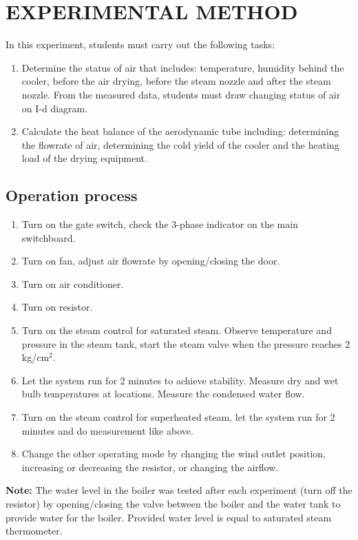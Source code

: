 \section{EXPERIMENTAL METHOD}
In this experiment, students must carry out the following tasks:
\begin{enumerate}
    \item Determine the status of air that includes: temperature, humidity behind the cooler, before the air drying, before the steam nozzle and after the steam nozzle. From the measured data, students must draw changing status of air on I-d diagram.
    \item Calculate the heat balance of the aerodynamic tube including: determining the flowrate of air, determining the cold yield of the cooler and the heating load of the drying equipment.
\end{enumerate}

\subsection{Operation process}
\begin{enumerate}
    \item Turn on the gate switch, check the 3-phase indicator on the main switchboard.
    \item Turn on fan, adjust air flowrate by opening/closing the door.
    \item Turn on air conditioner.
    \item Turn on resistor.
    \item Turn on the steam control for saturated steam. Observe temperature and pressure in the steam tank, start the steam valve when the pressure reaches 2 kg/cm$^2$.
    \item Let the system run for 2 minutes to achieve stability. Measure dry and wet bulb temperatures at locations. Measure the condensed water flow.
    \item Turn on the steam control for superheated steam, let the system run for 2 minutes and do measurement like above.
    \item Change the other operating mode by changing the wind outlet position, increasing or decreasing the resistor, or changing the airflow.
\end{enumerate}

\vspace{0.3cm}
\noindent \textbf{Note:}
The water level in the boiler was tested after each experiment (turn off the resistor) by opening/closing the valve between the boiler and the water tank to provide water for the boiler. Provided water level is equal to saturated steam thermometer.

